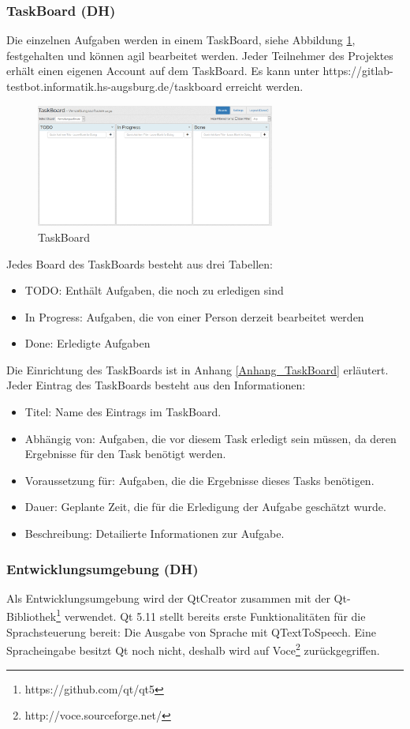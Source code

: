 \subsubsection{TaskBoard (DH)}
Die einzelnen Aufgaben werden in einem TaskBoard, siehe Abbildung \ref{fig:TaskBoard}, festgehalten und können agil bearbeitet werden. Jeder Teilnehmer des Projektes erhält einen eigenen Account auf dem TaskBoard. Es kann unter https://gitlab-testbot.informatik.hs-augsburg.de/taskboard erreicht werden.
\begin{figure}[htb]
	\centering
		\includegraphics[width=0.70\textwidth]{figures/TaskBoard.PNG}
	\caption{TaskBoard}
	\label{fig:TaskBoard}
\end{figure}
Jedes Board des TaskBoards besteht aus drei Tabellen: 
\begin{itemize}
	\item TODO: Enthält Aufgaben, die noch zu erledigen sind
	\item In Progress: Aufgaben, die von einer Person derzeit bearbeitet werden
	\item Done: Erledigte Aufgaben
\end{itemize}
Die Einrichtung des TaskBoards ist in Anhang \ref{Anhang_TaskBoard} erläutert.\\
Jeder Eintrag des TaskBoards besteht aus den Informationen:
\begin{itemize}
	\item Titel: Name des Eintrags im TaskBoard.
	\item Abhängig von: Aufgaben, die vor diesem Task erledigt sein müssen, da deren Ergebnisse für den Task benötigt werden.
	\item Voraussetzung für: Aufgaben, die die Ergebnisse dieses Tasks benötigen.
	\item Dauer: Geplante Zeit, die für die Erledigung der Aufgabe geschätzt wurde.
	\item Beschreibung: Detailierte Informationen zur Aufgabe.
\end{itemize}

\subsubsection{Entwicklungsumgebung (DH)}
Als Entwicklungsumgebung wird der QtCreator zusammen mit der Qt-Bibliothek\footnote{https://github.com/qt/qt5} verwendet. Qt 5.11 stellt bereits erste Funktionalitäten für die Sprachsteuerung bereit: Die Ausgabe von Sprache mit QTextToSpeech. Eine Spracheingabe besitzt Qt noch nicht, deshalb wird auf Voce\footnote{http://voce.sourceforge.net/} zurückgegriffen.

